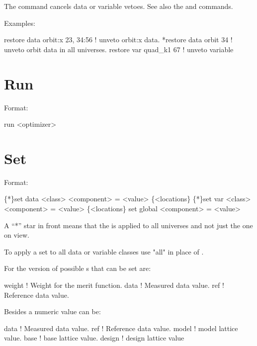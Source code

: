 \vskip 0.2in The  command cancels data or variable
vetoes. See also the 
and  commands.

Examples:
\begin{example}
  restore data orbit:x  23, 34:56 ! unveto orbit:x data.
  *restore data orbit 34          ! unveto orbit data in all universes.
  restore var quad_k1 67     ! unveto variable
\end{example}


\section{Run}
\label{s:run}

Format:
\begin{example}
  run <optimizer>
\end{example}

\vskip 0.2in

\section{Set}
\label{s:set}

Format:
\begin{example}
  \{*\}set data <class> <component> = <value> \{<locations\}
  \{*\}set var <class> <component> = <value> \{<locations\}
  set global <component> = <value>
\end{example}

\vskip 0.2in
A ``*'' star in front means that the  is applied
to all universes and not just the one on view.

To apply a set to all data or variable classes use "all"
in place of .

For the  version of  possible 
s that can be set are:
\begin{example}
  weight      ! Weight for the merit function.
  data        ! Measured data value.
  ref         ! Reference data value.
\end{example}
Besides a numeric value  can be:
\begin{example}
  data        ! Measured data value.
  ref         ! Reference data value.
  model       ! model lattice value.
  base        ! base lattice value.
  design      ! design lattice value
\end{example}

